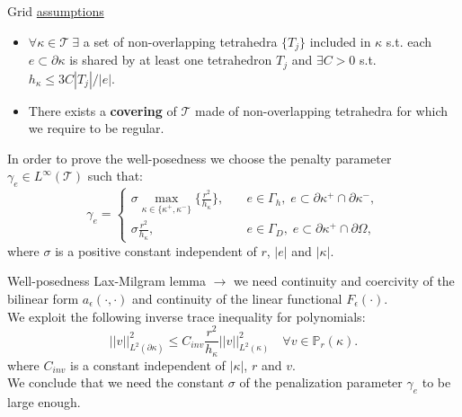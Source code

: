 \documentclass{beamer}
\begin{document}
\begin{frame}[label=main]{Grid \hyperlink{supplemental}{assumptions}}
	\begin{itemize}
	\item $\forall \kappa \in \mathcal{T}~\exists$ a set of non-overlapping 
	tetrahedra $\{T_j\}$ included in $\kappa$ s.t. each $ e \subset \partial 
	\kappa$ is shared by at least one tetrahedron $T_j$ and $\exists C > 0$ 
	s.t. $h_\kappa \leq 3C|T_j|/|e|$. 
	\item There exists a \textbf{covering} of $\mathcal{T}$ made of 
	non-overlapping	tetrahedra for which we require to be regular.
	\end{itemize}
	\vspace*{0.3cm}
	In order to prove the well-posedness we choose the penalty parameter
	$\gamma_e \in L^\infty(\mathcal{T})$ such that:
	\begin{equation*} \label{eq:penalty}
	\gamma_e =
	\begin{cases}
	\sigma \max\limits_{\kappa \in \{\kappa^+, \kappa^-\}} \big\{
	\frac{r^2}{h_\kappa}\big\},
	& \quad e \in \Gamma_h, \; e \subset \partial\kappa^+ \cap
	\partial\kappa^-,\\
	\sigma\frac{r^2}{h_\kappa},& \quad e \in \Gamma_D, \; e \subset
	\partial\kappa^+ \cap \partial\Omega,
	\end{cases}
	\end{equation*}
	where $\sigma$ is a positive constant independent of $r$, $|e|$ and
	$|\kappa|$.
\end{frame}
\begin{frame}{Well-posedness}
	Lax-Milgram lemma $\rightarrow$ we need continuity and coercivity of the
	bilinear form $a_\epsilon (\cdot, \cdot)$ and continuity of the linear
	functional $F_\epsilon(\cdot)$.\\
	\vspace*{0.5cm}
	We exploit the following inverse trace inequality for polynomials:
	\begin{equation*}
		|\!|v|\!|^2_{L^2(\partial\kappa)} \leq C_{inv} \frac{r^2}{h_\kappa} 
		|\!|v|\!|^2_{L^2(\kappa)} \quad \forall v \in \mathbb{P}_r(\kappa).
	\end{equation*}
	where $C_{inv}$ is a constant independent of $|\kappa|$, $r$ and $v$.\\
	\vspace*{0.5cm}
	We conclude that we need the constant $\sigma$ of the penalization 
	parameter $\gamma_e$ to be large enough.
\end{frame}
\end{document}
